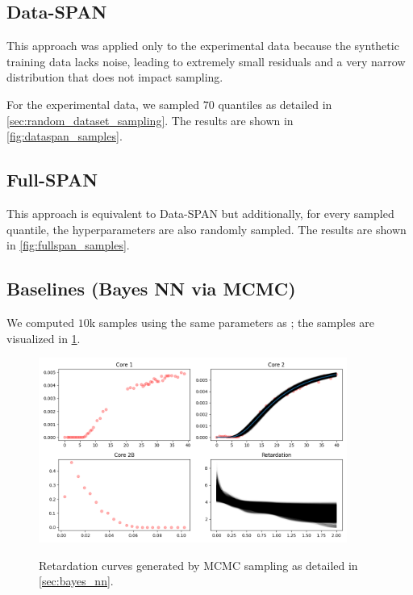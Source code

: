 \documentclass{article}
\begin{document}
\subsection{Data-SPAN}
This approach was applied only to the experimental data because the synthetic training data lacks noise, leading to extremely small residuals and a very narrow distribution that does not impact sampling.

For the experimental data, we sampled $70$ quantiles as detailed in \ref{sec:random_dataset_sampling}. The results are shown in \ref{fig:dataspan_samples}.



\subsection{Full-SPAN}
This approach is equivalent to Data-SPAN but additionally, for every sampled quantile, the hyperparameters are also randomly sampled. The results are shown in \ref{fig:fullspan_samples}.


\subsection{Baselines (Bayes NN via MCMC)}
We computed $10$k samples using the same parameters as \textcite{finn}; the samples are visualized in \ref{fig:mcmc_samples}.

\begin{figure}
    \centering
    \includegraphics[width=0.9\textwidth]{figs/finn_mcmc_samples.png}
    \label{fig:mcmc_samples}
    \caption{Retardation curves generated by MCMC sampling as detailed in \ref{sec:bayes_nn}.}
\end{figure}
\end{document}
